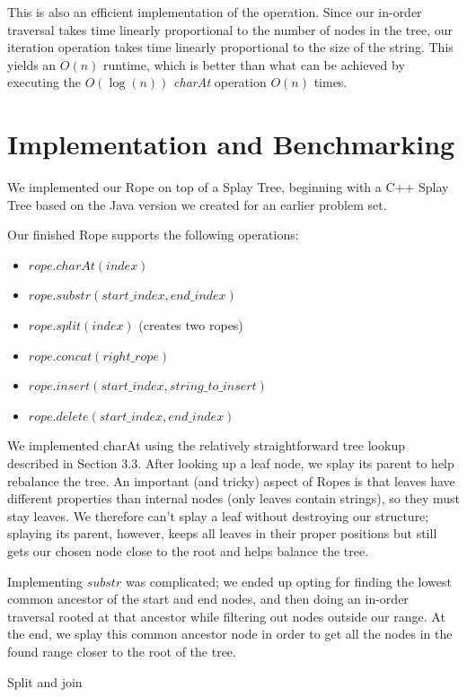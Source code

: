\documentclass[12pt]{article}
\begin{document}
This is also an efficient implementation of the operation. Since our in-order traversal takes time linearly proportional to the number of nodes in the tree, our iteration operation takes time linearly proportional to the size of the string. This yields an $O(n)$ runtime, which is better than what can be achieved by executing the $O(\log(n))$ \emph{charAt} operation $O(n)$ times.

\section{Implementation and Benchmarking}

We implemented our Rope on top of a Splay Tree, beginning with a C++ Splay Tree based on the Java version we created for an earlier problem set. 

Our finished Rope supports the following operations:
\begin{itemize}
\item $rope.charAt(index)$
\item $rope.substr(start\_index, end\_index)$
\item $rope.split(index)$ (creates two ropes)
\item $rope.concat(right\_rope)$
\item $rope.insert(start\_index, string\_to\_insert)$
\item $rope.delete(start\_index, end\_index)$
\end{itemize}

We implemented charAt using the relatively straightforward tree lookup described in Section $3.3$. After looking up a leaf node, we splay its parent to help rebalance the tree. An important (and tricky) aspect of Ropes is that leaves have different properties than internal nodes (only leaves contain strings), so they must stay leaves. We therefore can't splay a leaf without destroying our structure; splaying its parent, however, keeps all leaves in their proper positions but still gets our chosen node close to the root and helps balance the tree.

Implementing $substr$ was complicated; we ended up opting for finding the lowest common ancestor of the start and end nodes, and then doing an in-order traversal rooted at that ancestor while filtering out nodes outside our range. At the end, we splay this common ancestor node in order to get all the nodes in the found range closer to the root of the tree.

Split and join 
\end{document}
